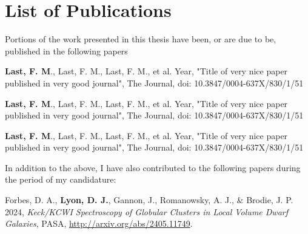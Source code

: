 \chapter{List of Publications}
\thispagestyle{empty}


Portions of the work presented in this thesis have been, or are due to be, published in the following papers

\vspace{1cm}
\noindent
\textbf{Last, F. M}., Last, F. M., Last, F. M., et al. Year, "Title of very nice paper published in very good journal", The Journal, doi: 10.3847/0004-637X/830/1/51

\vspace{0.5cm}
\noindent
\textbf{Last, F. M}., Last, F. M., Last, F. M., et al. Year, "Title of very nice paper published in very good journal", The Journal, doi: 10.3847/0004-637X/830/1/51

\vspace{0.5cm}
\noindent
\textbf{Last, F. M}., Last, F. M., Last, F. M., et al. Year, "Title of very nice paper published in very good journal", The Journal, doi: 10.3847/0004-637X/830/1/51

\vspace{1cm}
In addition to the above, I have also contributed to the following papers during the
period of my candidature:

\vspace{1cm}
\noindent
Forbes, D. A., \textbf{Lyon, D. J.}, Gannon, J., Romanowsky, A. J., \& Brodie, J. P. 2024, \textit{Keck/KCWI Spectroscopy of Globular Clusters in Local Volume Dwarf Galaxies}, PASA, \url{http://arxiv.org/abs/2405.11749}.